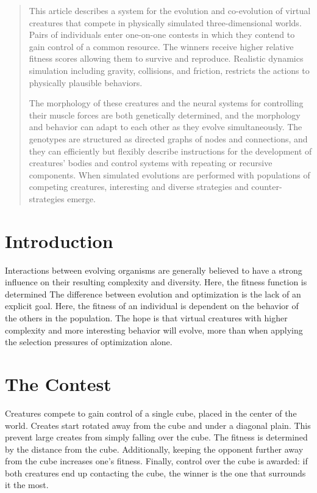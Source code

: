 \documentclass[../main.tex]{subfiles}
\begin{document}
\begin{abstract}
This article describes a system for the evolution and co-evolution of virtual creatures that compete in physically
simulated three-dimensional worlds. Pairs of individuals enter one-on-one contests in which they contend to gain
control of a common resource. The winners receive higher relative fitness scores allowing them to survive and
reproduce. Realistic dynamics simulation including gravity, collisions, and friction, restricts the actions to
physically plausible behaviors.

The morphology of these creatures and the neural systems for controlling their muscle forces are both genetically
determined, and the morphology and behavior can adapt to each other as they evolve simultaneously. The genotypes are
structured as directed graphs of nodes and connections, and they can efficiently but flexibly describe instructions for
the development of creatures' bodies and control systems with repeating or recursive components. When simulated
evolutions are performed with populations of competing creatures, interesting and diverse strategies and counter-
strategies emerge.
\end{abstract}

\begin{mdframed}
\end{mdframed}

\section{Introduction}

Interactions between evolving organisms are generally believed to have a strong influence on their resulting complexity
and diversity. Here, the fitness function is determined The difference between evolution and optimization is the lack
of an explicit goal. Here, the fitness of an individual is dependent on the behavior of the others in the population.
The hope is that virtual creatures with higher complexity and more interesting behavior will evolve, more than when
applying the selection pressures of optimization alone.

\section{The Contest}

Creatures compete to gain control of a single cube, placed in the center of the world. Creates start rotated away from
the cube and under a diagonal plain. This prevent large creates from simply falling over the cube. The fitness is
determined by the distance from the cube. Additionally, keeping the opponent further away from the cube increases one's
fitness. Finally, control over the cube is awarded: if both creatures end up contacting the cube, the winner is the one
that surrounds it the most.
\end{document}
